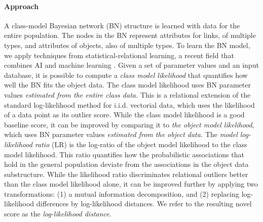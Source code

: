 \documentclass[conference]{IEEEtran}
\begin{document}
\paragraph{Approach} 
A class-model Bayesian network (BN) structure is learned with data for the entire population. The nodes in the BN represent attributes for links, of multiple types, and attributes of objects, also of multiple types. To learn the BN model, we apply techniques from statistical-relational learning, a  recent field that combines AI and machine learning \cite{SRL2007,Schulte2012,Domingos2009}. 
Given a set of parameter values and an input database, it is possible to compute a {\em class model likelihood} that quantifies how well the BN fits the object data. The class model likelihood uses BN parameter values {\em estimated from the entire class data.} This  is a relational extension of the standard log-likelihood method for i.i.d. vectorial data, which uses the likelihood of a data point as its outlier score. %
 While the class model likelihood is a good baseline score, it can be improved by comparing it to {\em the object model likelihood}, which uses BN parameter values {\em estimated from the object data.}
The {\em model log-likelihood ratio} (LR) is the log-ratio of the object model likelihood to the class model likelihood. This ratio quantifies how the probabilistic associations that hold in the general population deviate from the associations in the object data substructure.
While the 
likelihood ratio discriminates relational outliers better than the class model likelihood alone, it can be improved further by applying two transformations: (1) a mutual information decomposition, and (2) replacing log-likelihood differences by log-likelihood distances. We refer to the resulting novel score as the {\em log-likelihood distance}.
%
\end{document}
